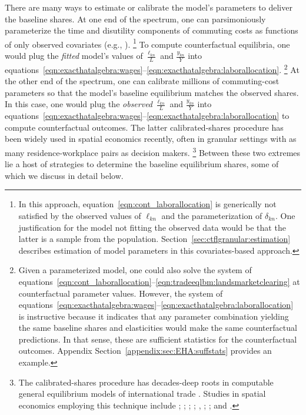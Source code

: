 \documentclass[11pt]{article}
\theoremstyle{definition}
\begin{document}
There are many ways to estimate or calibrate the model's parameters to deliver the baseline shares.
At one end of the spectrum,
one can parsimoniously parameterize the time and disutility components of commuting costs as functions of only observed covariates (e.g., \citealt{AhlfeldtReddingSturmWolf:2015}).%
\footnote{
	In this approach, equation~\eqref{eqn:cont_laborallocation} is generically not satisfied by the observed values of $\ell_{kn}$ and the parameterization of $\delta_{kn}$.
	One justification for the model not fitting the observed data would be that the latter is a sample from the population.
	Section~\ref{sec:ctflgranular:estimation} describes estimation of model parameters in this covariates-based approach.
}
To compute counterfactual equilibria, one would plug the \emph{fitted} model's values of 
$\frac{\ell_{kn}}{L}$ and $\frac{y_{kn}}{Y}$ 
into equations~\eqref{eqn:exacthatalgebra:wages}--\eqref{eqn:exacthatalgebra:laborallocation}.%
\footnote{
	Given a parameterized model, one could also solve the system of equations~\eqref{eqn:cont_laborallocation}--\eqref{eqn:tradeeqlbm:landsmarketclearing} at counterfactual parameter values.
	However, the system of equations~\eqref{eqn:exacthatalgebra:wages}--\eqref{eqn:exacthatalgebra:laborallocation} is instructive because it indicates that
	any parameter combination yielding the same baseline shares and elasticities would make the same counterfactual predictions.
	In that sense, these are sufficient statistics for the counterfactual outcomes.
	Appendix Section~\ref{appendix:sec:EHA:suffstats} provides an example.
}
At the other end of the spectrum,
one can calibrate millions of commuting-cost parameters so that the model's baseline equilibrium matches the observed shares.
In this case, one would plug the \emph{observed} $\frac{\ell_{kn}}{L}$ and $\frac{y_{kn}}{Y}$
into equations~\eqref{eqn:exacthatalgebra:wages}--\eqref{eqn:exacthatalgebra:laborallocation} to compute counterfactual outcomes.
The latter calibrated-shares procedure
has been widely used in spatial economics recently,
often in granular settings with as many residence-workplace pairs as decision makers.%
\footnote{
	The calibrated-shares procedure has decades-deep roots in computable general equilibrium models of international trade \citep{Rutherford:1995}.
	Studies in spatial economics employing this technique include \cite{AllenArkolakisLi:2016}; \cite{Perez-Cervantes:2016}; \cite{WaddellSarte:2016}; \cite{MonteReddingRossi-Hansberg:2018}; \cite{HeblichReddingSturm:2020}, \cite{KrebsPfluger:2023}; \cite{Severen:2023}; and \cite{OwensRossi-HansbergSarte:2020}.
} 
Between these two extremes lie a host of strategies to determine the baseline equilibrium shares, some of which we discuss in detail below.
\end{document}
